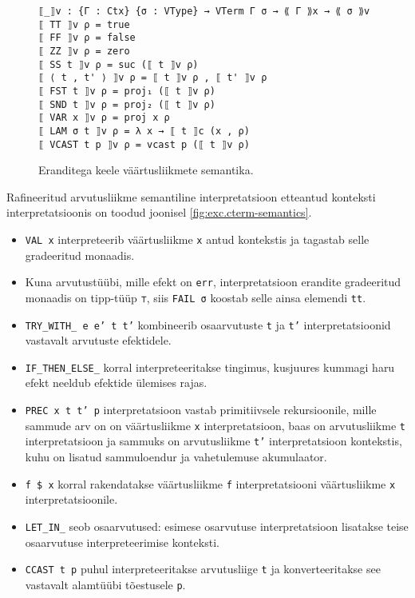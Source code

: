 \documentclass[a4paper,12pt]{article}
\begin{document}
\begin{figure}
  \begin{BVerbatim}
⟦_⟧v : {Γ : Ctx} {σ : VType} → VTerm Γ σ → ⟪ Γ ⟫x → ⟪ σ ⟫v
⟦ TT ⟧v ρ = true
⟦ FF ⟧v ρ = false
⟦ ZZ ⟧v ρ = zero
⟦ SS t ⟧v ρ = suc (⟦ t ⟧v ρ)
⟦ ⟨ t , t' ⟩ ⟧v ρ = ⟦ t ⟧v ρ , ⟦ t' ⟧v ρ
⟦ FST t ⟧v ρ = proj₁ (⟦ t ⟧v ρ)
⟦ SND t ⟧v ρ = proj₂ (⟦ t ⟧v ρ)
⟦ VAR x ⟧v ρ = proj x ρ
⟦ LAM σ t ⟧v ρ = λ x → ⟦ t ⟧c (x , ρ)
⟦ VCAST t p ⟧v ρ = vcast p (⟦ t ⟧v ρ)
  \end{BVerbatim}
  \caption{Eranditega keele väärtusliikmete semantika.}
  \label{fig:exc.vterm-semantics}
\end{figure}

Rafineeritud arvutusliikme semantiline interpretatsioon etteantud konteksti interpretatsioonis on toodud joonisel \ref{fig:exc.cterm-semantics}.
\begin{itemize}
\item {\tt VAL x} interpreteerib väärtusliikme {\tt x} antud kontekstis ja tagastab selle gradeeritud monaadis.
\item Kuna arvutustüübi, mille efekt on {\tt err}, interpretatsioon erandite gradeeritud monaadis on tipp-tüüp {\tt ⊤}, siis {\tt FAIL σ} koostab selle ainsa elemendi {\tt tt}.
\item {\tt TRY_WITH_ {e} {e'} t t'} kombineerib osaarvutuste {\tt t} ja {\tt t'} interpretatsioonid vastavalt arvutuste efektidele. 
\item {\tt IF_THEN_ELSE_} korral interpreteeritakse tingimus, kusjuures kummagi haru efekt neeldub efektide ülemises rajas.
\item {\tt PREC x t t' p} interpretatsioon vastab primitiivsele rekursioonile, mille sammude arv on on väärtusliikme {\tt x} interpretatsioon, baas on arvutusliikme {\tt t} interpretatsioon ja sammuks on arvutusliikme {\tt t'} interpretatsioon kontekstis, kuhu on lisatud sammuloendur ja vahetulemuse akumulaator. 
\item {\tt f \$ x} korral rakendatakse väärtusliikme {\tt f} interpretatsiooni väärtusliikme {\tt x} interpretatsioonile.
\item {\tt LET_IN_} seob osaarvutused: esimese osarvutuse interpretatsioon lisatakse teise osaarvutuse interpreteerimise konteksti.
\item {\tt CCAST t p} puhul interpreteeritakse arvutusliige {\tt t} ja konverteeritakse see vastavalt alamtüübi tõestusele {\tt p}.
\end{itemize}
\end{document}
